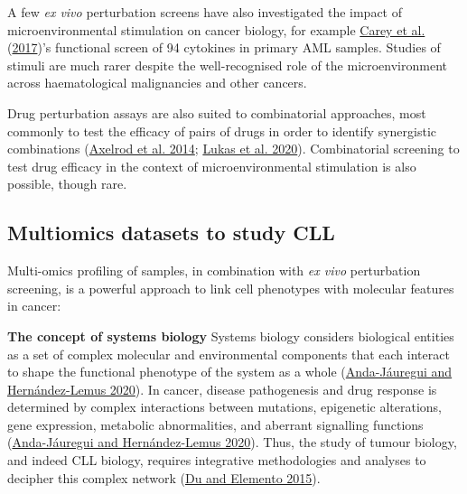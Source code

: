 \documentclass[11pt, a4paper, twosided]{book}
\begin{document}
A few \emph{ex vivo} perturbation screens have also investigated the impact of microenvironmental stimulation on cancer biology, for example \protect\hyperlink{ref-Carey2017}{Carey et al.} (\protect\hyperlink{ref-Carey2017}{2017})'s functional screen of 94 cytokines in primary AML samples. Studies of stimuli are much rarer despite the well-recognised role of the microenvironment across haematological malignancies and other cancers.

Drug perturbation assays are also suited to combinatorial approaches, most commonly to test the efficacy of pairs of drugs in order to identify synergistic combinations (\protect\hyperlink{ref-Axelrod2014}{Axelrod et al. 2014}; \protect\hyperlink{ref-Lukas2020}{Lukas et al. 2020}). Combinatorial screening to test drug efficacy in the context of microenvironmental stimulation is also possible, though rare.

\hypertarget{multi-omics-cll-intro}{%
\subsection{Multiomics datasets to study CLL}\label{multi-omics-cll-intro}}

Multi-omics profiling of samples, in combination with \emph{ex vivo} perturbation screening, is a powerful approach to link cell phenotypes with molecular features in cancer:

\textbf{The concept of systems biology }
Systems biology considers biological entities as a set of complex molecular and environmental components that each interact to shape the functional phenotype of the system as a whole (\protect\hyperlink{ref-Anda2020}{Anda-Jáuregui and Hernández-Lemus 2020}). In cancer, disease pathogenesis and drug response is determined by complex interactions between mutations, epigenetic alterations, gene expression, metabolic abnormalities, and aberrant signalling functions (\protect\hyperlink{ref-Anda2020}{Anda-Jáuregui and Hernández-Lemus 2020}). Thus, the study of tumour biology, and indeed CLL biology, requires integrative methodologies and analyses to decipher this complex network (\protect\hyperlink{ref-Du2015}{Du and Elemento 2015}).
\end{document}

